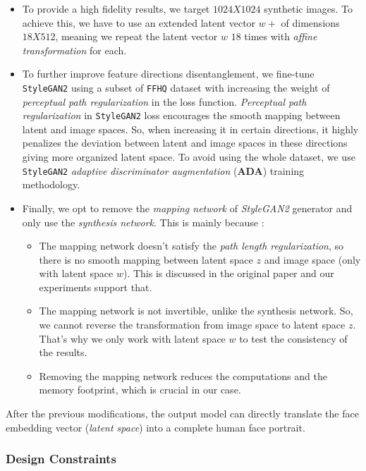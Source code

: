 \begin{itemize}
    \item To provide a high fidelity results, we target $1024X1024$ synthetic images. To achieve this, we have to use an extended latent vector $w+$ of dimensions $18X512$, meaning we repeat the latent vector $w$ $18$ times with \emph{affine transformation} for each.
    \item To further improve feature directions disentanglement, we fine-tune \texttt{StyleGAN2} using a subset of \texttt{FFHQ} dataset with increasing the weight of \emph{perceptual path regularization} in the loss function. \emph{Perceptual path regularization} in \texttt{StyleGAN2} loss encourages the smooth mapping between latent and image spaces. So, when increasing it in certain directions, it highly penalizes the deviation between latent and image spaces in these directions giving more organized latent space. To avoid using the whole dataset, we use \texttt{StyleGAN2} \emph{adaptive discriminator augmentation} (\textbf{ADA}) \cite{karras2020training} training methodology.
    \item Finally, we opt to remove the \emph{mapping network} of \emph{StyleGAN2} generator and only use the \emph{synthesis network}. This is mainly because :
    \begin{itemize}
        \item The mapping network doesn't satisfy the \emph{path length regularization}, so there is no smooth mapping between latent space $z$ and image space (only with latent space $w$). This is discussed in the original paper \cite{karras2020analyzing} and our experiments support that.
        \item The mapping network is not invertible, unlike the synthesis network. So, we cannot reverse the transformation from image space to latent space $z$. That's why we only work with latent space $w$ to test the consistency of the results.
        \item Removing the mapping network reduces the computations and the memory footprint, which is crucial in our case.
    \end{itemize}
\end{itemize}

After the previous modifications, the output model can directly translate the face embedding vector (\emph{latent space}) into a complete human face portrait.

\subsubsection{Design Constraints}

